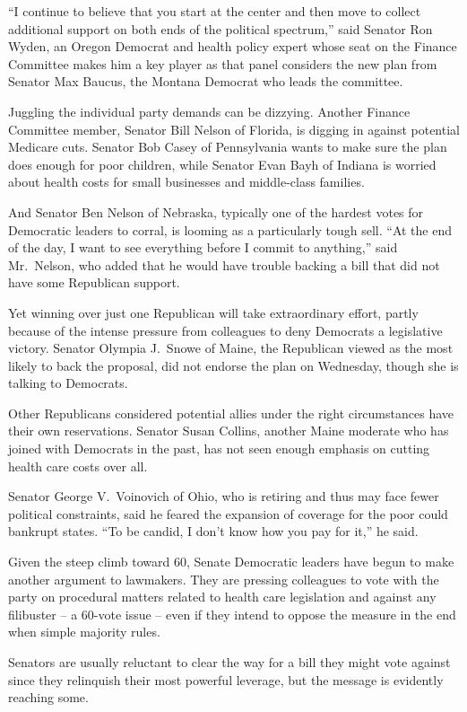 ﻿\documentclass[12pt]{article}
\begin{document}
``I continue to believe that you start at the center and then move to collect additional support on
both ends of the political spectrum,'' said Senator Ron Wyden, an Oregon Democrat and health policy
expert whose seat on the Finance Committee makes him a key player as that panel considers the new
plan from Senator Max Baucus, the Montana Democrat who leads the committee.

Juggling the individual party demands can be dizzying. Another Finance Committee member, Senator
Bill Nelson of Florida, is digging in against potential Medicare cuts. Senator Bob Casey of
Pennsylvania wants to make sure the plan does enough for poor children, while Senator Evan Bayh of
Indiana is worried about health costs for small businesses and middle-class families.

And Senator Ben Nelson of Nebraska, typically one of the hardest votes for Democratic leaders to
corral, is looming as a particularly tough sell. ``At the end of the day, I want to see everything
before I commit to anything,'' said Mr.~Nelson, who added that he would have trouble backing a bill
that did not have some Republican support.

Yet winning over just one Republican will take extraordinary effort, partly because of the intense
pressure from colleagues to deny Democrats a legislative victory. Senator Olympia J.~Snowe of Maine,
the Republican viewed as the most likely to back the proposal, did not endorse the plan on
Wednesday, though she is talking to Democrats.

Other Republicans considered potential allies under the right circumstances have their own
reservations. Senator Susan Collins, another Maine moderate who has joined with Democrats in the
past, has not seen enough emphasis on cutting health care costs over all.

Senator George V.~Voinovich of Ohio, who is retiring and thus may face fewer political constraints,
said he feared the expansion of coverage for the poor could bankrupt states. ``To be candid, I don't
know how you pay for it,'' he said.

Given the steep climb toward 60, Senate Democratic leaders have begun to make another argument to
lawmakers. They are pressing colleagues to vote with the party on procedural matters related to
health care legislation and against any filibuster -- a 60-vote issue -- even if they intend to
oppose the measure in the end when simple majority rules.

Senators are usually reluctant to clear the way for a bill they might vote against since they
relinquish their most powerful leverage, but the message is evidently reaching some.
\end{document}
